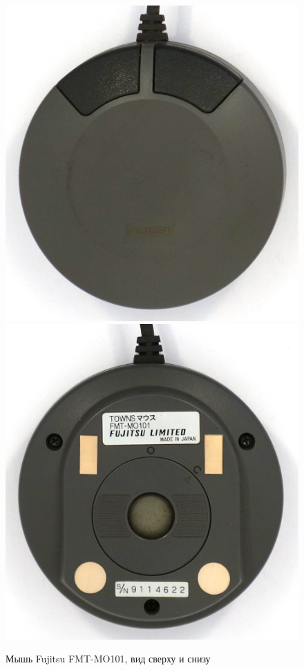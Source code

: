 \documentclass[11pt, a4paper]{article}
\begin{document}
\begin{figure}[h]
    \centering
    \includegraphics[scale=0.5]{1989_fujitsu_fmt_mo101_mouse/top_30.jpg}
    \includegraphics[scale=0.5]{1989_fujitsu_fmt_mo101_mouse/bottom_30.jpg}
    \caption{Мышь Fujitsu FMT-MO101, вид сверху и снизу}
    \label{fig:FMT1TopAndBottom}
\end{figure}
\end{document}
